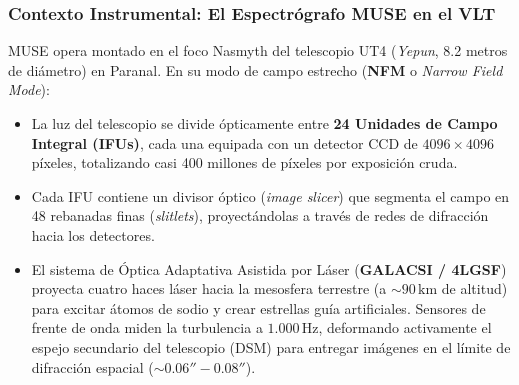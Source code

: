 \documentclass[11pt,a4paper]{article}
\begin{document}
\subsubsection{Contexto Instrumental: El Espectrógrafo MUSE en el VLT}
MUSE opera montado en el foco Nasmyth del telescopio UT4 (\textit{Yepun}, 8.2 metros de diámetro) en Paranal. En su modo de campo estrecho (\textbf{NFM} o \textit{Narrow Field Mode}):
\begin{itemize}[leftmargin=1.0cm]
    \item La luz del telescopio se divide ópticamente entre \textbf{24 Unidades de Campo Integral (IFUs)}, cada una equipada con un detector CCD de $4096 \times 4096$ píxeles, totalizando casi 400 millones de píxeles por exposición cruda.
    \item Cada IFU contiene un divisor óptico (\textit{image slicer}) que segmenta el campo en 48 rebanadas finas (\textit{slitlets}), proyectándolas a través de redes de difracción hacia los detectores.
    \item El sistema de Óptica Adaptativa Asistida por Láser (\textbf{GALACSI / 4LGSF}) proyecta cuatro haces láser hacia la mesosfera terrestre (a $\sim 90\,\text{km}$ de altitud) para excitar átomos de sodio y crear estrellas guía artificiales. Sensores de frente de onda miden la turbulencia a $1.000\,\text{Hz}$, deformando activamente el espejo secundario del telescopio (DSM) para entregar imágenes en el límite de difracción espacial ($\sim 0.06'' - 0.08''$).
\end{itemize}
\end{document}
